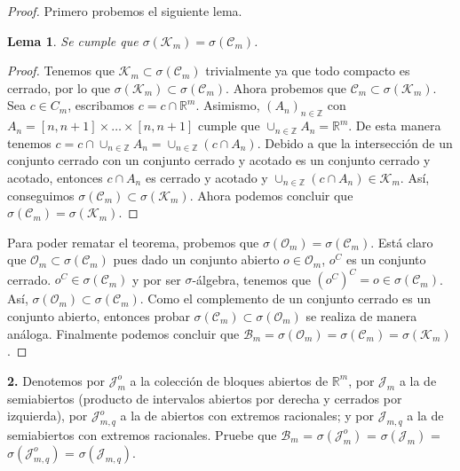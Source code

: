 \documentclass{article}
\newenvironment{statement}[1]{\smallskip\noindent\color[rgb]{1.00,0.00,0.50} {\bf #1.}}{}
\newtheorem{lemma}[theorem]{Lema}
\theoremstyle{definition}
\theoremstyle{remark}
\newcommand{\BR}{\mathbb R}
\newcommand{\BZ}{\mathbb Z}
\begin{document}
\begin{proof}
Primero probemos el siguiente lema.
  \begin{lemma}
    Se cumple que $\sigma(\mathcal{K}_m) = \sigma(\mathcal{C}_m)$.
  \end{lemma}
  \begin{proof}
    Tenemos que $\mathcal{K}_m \subset \sigma(\mathcal{C}_m)$ trivialmente
    ya que todo compacto es cerrado, por lo que
    $\sigma(\mathcal{K}_m) \subset \sigma(\mathcal{C}_m)$.
    Ahora probemos que $\mathcal{C}_m \subset \sigma(\mathcal{K}_m)$.
    Sea $c \in C_m$, escribamos $c = c \cap \BR^m$. Asimismo, $(A_n)_{n \in \BZ}$
    con $A_n = [n, n + 1] \times \dots \times [n, n + 1]$ cumple que
    $\cup_{n \in \BZ} A_n = \BR^m$. De esta manera tenemos
    $c = c \cap \cup_{n \in \BZ} A_n = \cup_{n \in \BZ} (c \cap A_n)$.
    Debido a que la intersecci\'on de un conjunto cerrado con un conjunto cerrado
    y acotado es un conjunto cerrado y acotado, entonces
    $c \cap A_n$ es cerrado y acotado y $\cup_{n \in \BZ} (c \cap A_n)
    \in \mathcal{K}_m$. As\'i, conseguimos $\sigma(\mathcal{C}_m) \subset \sigma(\mathcal{K}_m)$.
    Ahora podemos concluir que $\sigma(\mathcal{C}_m) = \sigma(\mathcal{K}_m)$.
  \end{proof}
  Para poder rematar el teorema, probemos que
  $\sigma(\mathcal{O}_m) = \sigma(\mathcal{C}_m)$.
  Est\'a claro que $\mathcal{O}_m \subset \sigma(\mathcal{C}_m)$ pues dado
  un conjunto abierto $o \in \mathcal{O}_m$, $o^C$ es un conjunto cerrado.
  $o^C \in \sigma(\mathcal{C}_m)$ y por ser $\sigma$-\'algebra, tenemos que
  $(o^C)^C = o \in \sigma(\mathcal{C}_m)$.
  As\'i, $\sigma(\mathcal{O}_m) \subset \sigma(\mathcal{C}_m)$. Como el
  complemento de un conjunto cerrado es un conjunto abierto, entonces probar
  $\sigma(\mathcal{C}_m) \subset \sigma(\mathcal{O}_m)$ se realiza de manera
  an\'aloga.
  Finalmente podemos concluir que $\mathcal{B}_m = \sigma(\mathcal{O}_m) =
  \sigma(\mathcal{C}_m) = \sigma(\mathcal{K}_m)$.
\end{proof}

\begin{statement}{2}
  Denotemos por $\mathcal{J}_m^o$ a la colección de bloques abiertos de
  $\mathbb{R}^m$, por $\mathcal{J}_m$ a la de semiabiertos (producto de
  intervalos abiertos por derecha y cerrados por izquierda),
  por $\mathcal{J}_{m,q}^o$ a la de abiertos con extremos racionales;
  y por $\mathcal{J}_{m,q}$ a la de semiabiertos con extremos racionales.
  Pruebe que  $\mathcal{B}_m$ = $\sigma(\mathcal{J}_m^o)$ =
  $\sigma(\mathcal{J}_m)$ = $\sigma(\mathcal{J}_{m,q}^o)$ =
  $\sigma(\mathcal{J}_{m,q})$.
\end{statement}
\end{document}

